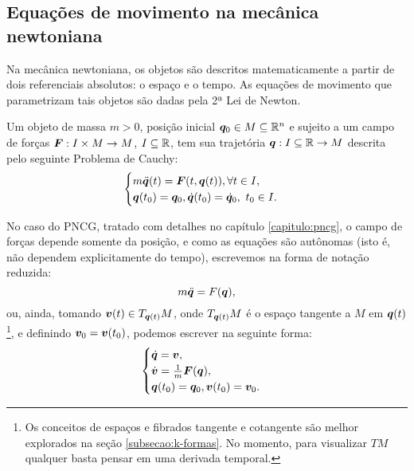 \subsection{Equações de movimento na mecânica newtoniana}
Na mecânica newtoniana, os objetos são descritos matematicamente a partir de dois referenciais absolutos: o espaço e o tempo. As equações de movimento que parametrizam tais objetos são dadas pela 2ª Lei de Newton.

\begin{definition}
    Um objeto de massa $m > 0$, posição inicial $\bm q_0 \in M \subseteq \mathbb{R}^n$ e sujeito a um campo de forças $\bm F: I \times M \to M$, $I \subseteq \mathbb{R}$, tem sua trajetória $\bm q: I \subseteq \mathbb{R} \to M$ descrita pelo seguinte Problema de Cauchy:
    \begin{equation}\label{eq:segunda_lei_de_newton}
        \begin{cases}
            m \ddot {\bm q} (t) = \bm F(t, \bm q(t)), \forall t \in I, \\
            \bm q(t_0) = \bm q_0, \dot {\bm q}(t_0) = \dot {\bm q}_0, \ t_0 \in I.
        \end{cases}
    \end{equation}
\end{definition}

No caso do PNCG, tratado com detalhes no capítulo \ref{capitulo:pncg}, o campo de forças depende somente da posição, e como as equações são autônomas (isto é, não dependem explicitamente do tempo), escrevemos na forma de notação reduzida:
\begin{equation}
    m \ddot {\bm q} = F(\bm q),
\end{equation}
ou, ainda, tomando $\bm v(t) \in T_{\bm q(t)} M$, onde $T_{\bm q(t)} M$ é o espaço tangente a $M$ em $\bm q(t)$\footnote{Os conceitos de espaços e fibrados tangente e cotangente são melhor explorados na seção \ref{subsecao:k-formas}. No momento, para visualizar $TM$ qualquer basta pensar em uma derivada temporal.}, e definindo $\bm v_0 = \bm v(t_0)$, podemos escrever na seguinte forma:
\begin{equation}
    \begin{cases}
        \dot {\bm q} = \bm v, \\
        \dot {\bm v} = \frac{1}{m} \bm F(\bm q), \\
        \bm q(t_0) = \bm q_0, \bm v(t_0) = \bm v_0.
    \end{cases}
\end{equation}

